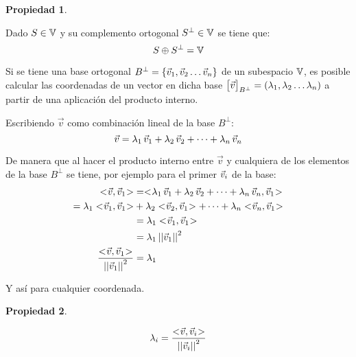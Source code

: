 \documentclass[a5paper,12pt,twoside]{book}
\newtheorem{prop}{{Propiedad}}[chapter]
\begin{document}
\begin{mdframed}[style=MyFrame1]
    \begin{prop}
        \label{prop:comp2}
    \end{prop}
    Dado $S \in \mathbb{V}$ y su complemento ortogonal $S^\perp \in \mathbb{V}$ se tiene que:
    \begin{equation*}
        S \oplus S^\perp = \mathbb{V}
    \end{equation*}
\end{mdframed}

Si se tiene una base ortogonal $B^\perp = { \left\{ {\Vec{v}_1 , \Vec{v}_2 \dots \Vec{v}_n} \right\} }$ de un subespacio $\mathbb{V}$, es posible calcular las coordenadas de un vector en dicha base ${ \begin{bmatrix} \Vec{v} \end{bmatrix} }_{B^\perp}=(\lambda_1 , \lambda_2 \dots \lambda_n)$ a partir de una aplicación del producto interno.

Escribiendo $\Vec{v}$ como combinación lineal de la base $B^\perp$:
\begin{equation*}
    \Vec{v} = \lambda_1 \, \Vec{v}_1 + \lambda_2 \, \Vec{v}_2 + \dots + \lambda_n \, \Vec{v}_n
\end{equation*}

De manera que al hacer el producto interno entre $\Vec{v}$ y cualquiera de los elementos de la base $B^\perp$ se tiene, por ejemplo para el primer $\Vec{v}_i$ de la base:
\begin{align*}
    \intProd{\Vec{v}}{\Vec{v}_1} &= \intProd{\lambda_1 \, \Vec{v}_1 + \lambda_2 \, \Vec{v}_2 + \dots + \lambda_\nth \, \Vec{v}_\nth}{\Vec{v}_1}
    \\
    = \lambda_1 \intProd{\Vec{v}_1}{\Vec{v}_1} &+ \lambda_2 \intProd{\Vec{v}_2}{\Vec{v}_1} + \dots + \lambda_\nth \intProd{\Vec{v}_\nth}{\Vec{v}_1}
    \\
    &= \lambda_1 \intProd{\Vec{v}_1}{\Vec{v}_1}
    \\
    &= \lambda_1 \, \nnorm{\Vec{v}_1}^2
    \\
    \frac{\intProd{\Vec{v}}{\Vec{v}_1}}{\nnorm{\Vec{v}_1}^2}&= \lambda_1
\end{align*}

Y así para cualquier coordenada.

\begin{mdframed}[style=MyFrame1]
    \begin{prop}
        \label{prop:orto3}
    \end{prop}
    \begin{equation*}
        \lambda_i = \frac{<\hspace{-0.8mm}\Vec{v},\Vec{v}_i\hspace{-0.8mm}>}{{\left|\left| {\Vec{v}_i} \right|\right|}^2}
    \end{equation*}
\end{mdframed}
\end{document}
